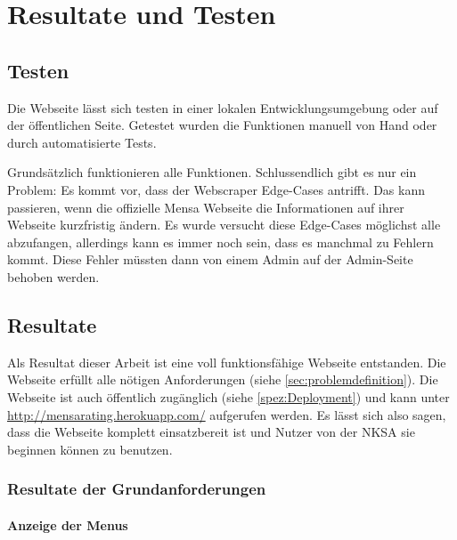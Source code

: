 \chapter{Resultate und Testen} \label{chap:resultate}

\section{Testen} \label{sec:testen}

Die Webseite lässt sich testen in einer lokalen Entwicklungsumgebung oder auf
der öffentlichen Seite. Getestet wurden die Funktionen manuell von Hand oder
durch automatisierte Tests.

Grundsätzlich funktionieren alle Funktionen. Schlussendlich gibt es nur ein
Problem: Es kommt vor, dass der Webscraper Edge-Cases antrifft. Das kann
passieren, wenn die offizielle Mensa Webseite die Informationen auf ihrer
Webseite kurzfristig ändern. Es wurde versucht diese Edge-Cases möglichst alle
abzufangen, allerdings kann es immer noch sein, dass es manchmal zu Fehlern
kommt. Diese Fehler müssten dann von einem Admin auf der Admin-Seite behoben
werden.

\section{Resultate} \label{sec:resultate}

Als Resultat dieser Arbeit ist eine voll funktionsfähige Webseite entstanden.
Die Webseite erfüllt alle nötigen Anforderungen (siehe
\ref{sec:problemdefinition}). Die Webseite ist auch öffentlich zugänglich
(siehe \ref{spez:Deployment}) und kann unter
\url{http://mensarating.herokuapp.com/} aufgerufen werden. Es lässt sich also
sagen, dass die Webseite komplett einsatzbereit ist und Nutzer von der NKSA sie
beginnen können zu benutzen.

\subsection{Resultate der Grundanforderungen}
 
\newpage

\subsubsection*{Anzeige der Menus}

